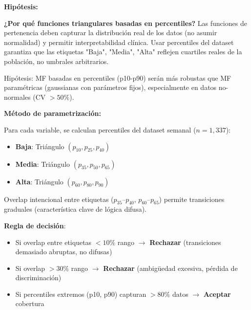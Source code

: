 \documentclass[12pt,letterpaper,twoside]{report}
\begin{document}
\begin{hipotesisbox}
\textbf{Hipótesis:}

\textbf{¿Por qué funciones triangulares basadas en percentiles?} Las funciones de pertenencia deben capturar la distribución real de los datos (no asumir normalidad) y permitir interpretabilidad clínica. Usar percentiles del dataset garantiza que las etiquetas "Baja", "Media", "Alta" reflejen cuartiles reales de la población, no umbrales arbitrarios.

Hipótesis: MF basadas en percentiles (p10-p90) serán más robustas que MF paramétricas (gaussianas con parámetros fijos), especialmente en datos no-normales (CV $> 50\%$).
\end{hipotesisbox}

\begin{estadisticobox}
\textbf{Método de parametrización:}

Para cada variable, se calculan percentiles del dataset semanal ($n=1,337$):
\begin{itemize}[noitemsep]
    \item \textbf{Baja}: Triángulo $(p_{10}, p_{25}, p_{40})$
    \item \textbf{Media}: Triángulo $(p_{35}, p_{50}, p_{65})$
    \item \textbf{Alta}: Triángulo $(p_{60}, p_{80}, p_{90})$
\end{itemize}

Overlap intencional entre etiquetas ($p_{35}$--$p_{40}$, $p_{60}$--$p_{65}$) permite transiciones graduales (característica clave de lógica difusa).
\end{estadisticobox}

\begin{reglabox}
\textbf{Regla de decisión}:

\begin{itemize}[noitemsep]
    \item Si overlap entre etiquetas $< 10\%$ rango $\to$ \textbf{Rechazar} (transiciones demasiado abruptas, no difusas)
    \item Si overlap $> 30\%$ rango $\to$ \textbf{Rechazar} (ambigüedad excesiva, pérdida de discriminación)
    \item Si percentiles extremos (p10, p90) capturan $> 80\%$ datos $\to$ \textbf{Aceptar} cobertura
\end{itemize}
\end{reglabox}
\end{document}
